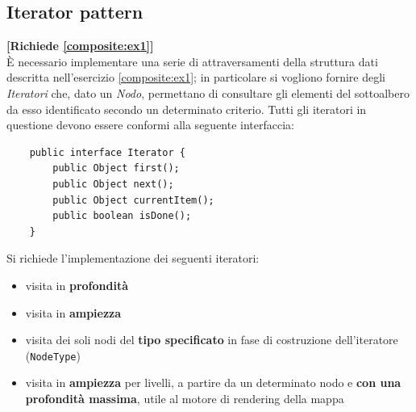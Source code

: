 \documentclass[12pt,a4paper]{article}
\begin{document}
    
    
    \subsection{Iterator pattern}
    \begin{Exercise}
    \small\textbf{[Richiede \hyperlink{composite:ex1}{\ref{composite:ex1}}]} \\
        È necessario implementare una serie di attraversamenti della struttura dati descritta nell'esercizio \hyperlink{composite:ex1}{\ref{composite:ex1}}; in particolare si vogliono fornire degli \textit{Iteratori} che, dato un \textit{Nodo}, permettano di consultare gli elementi del sottoalbero da esso identificato secondo un determinato criterio.
        Tutti gli iteratori in questione devono essere conformi alla seguente interfaccia:
        \begin{lstlisting}
    public interface Iterator {
        public Object first();
        public Object next();
        public Object currentItem();
        public boolean isDone();
    }
        \end{lstlisting}
        Si richiede l'implementazione dei seguenti iteratori:
        \begin{itemize}
            \item visita in \textbf{profondità}
            \item visita in \textbf{ampiezza}
            \item visita dei soli nodi del \textbf{tipo specificato} in fase di costruzione dell'iteratore (\texttt{NodeType})
            \item visita in \textbf{ampiezza} per livelli, a partire da un determinato nodo e \textbf{con una profondità massima}, utile al motore di rendering della mappa
        \end{itemize}
    
    \end{Exercise}

\end{document}
